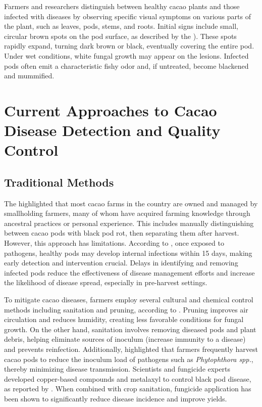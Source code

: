 Farmers and researchers distinguish between healthy cacao plants and those infected with diseases by observing specific visual symptoms on various parts of the plant, such as leaves, pods, stems, and roots. Initial signs include small, circular brown spots on the pod surface, as described by the \cite{MinistryAgri}). These spots rapidly expand, turning dark brown or black, eventually covering the entire pod. Under wet conditions, white fungal growth may appear on the lesions. Infected pods often emit a characteristic fishy odor and, if untreated, become blackened and mummified.

\section{Current Approaches to Cacao Disease Detection and Quality Control}
\subsection{Traditional Methods}
The \cite{PhilCacaoRoadmap2021} highlighted that most cacao farms in the country are owned and managed by smallholding farmers, many of whom have acquired farming knowledge through ancestral practices or personal experience. This includes manually distinguishing between cacao pods with black pod rot, then separating them after harvest. However, this approach has limitations. According to \cite{ForestPhytophthora}, once exposed to pathogens, healthy pods may develop internal infections within 15 days, making early detection and intervention crucial. Delays in identifying and removing infected pods reduce the effectiveness of disease management efforts and increase the likelihood of disease spread, especially in pre-harvest settings.

To mitigate cacao diseases, farmers employ several cultural and chemical control methods including sanitation and pruning, according to \cite{AceboGuerrero2012}. Pruning improves air circulation and reduces humidity, creating less favorable conditions for fungal growth. On the other hand, sanitation involves removing diseased pods and plant debris, helping eliminate sources of inoculum (increase immunity to a disease) and prevents reinfection. Additionally, \cite{Merga2022} highlighted that farmers frequently harvest cacao pods to reduce the inoculum load of pathogens such as \textit{Phytophthora spp.}, thereby minimizing disease transmission. Scientists and fungicide experts developed copper-based compounds and metalaxyl to control black pod disease, as reported by \cite{Aneani2007}. When combined with crop sanitation, fungicide application has been shown to significantly reduce disease incidence and improve yields.

